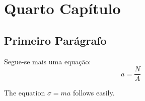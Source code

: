 \chapter{Quarto Capítulo}

\graphicspath{{Chapters/Chapter3/Chapter3Figs/PNG/}{Chapters/Chapter3/Chapter3Figs/PDF/}{Chapters/Chapter3/Chapter3Figs/}}


\section{Primeiro Parágrafo}

Segue-se mais uma equação:
\begin{equation}
a=\frac{N}{A}
\end{equation}%

%
%
%

The equation $\sigma = m a$%
%
follows easily.
